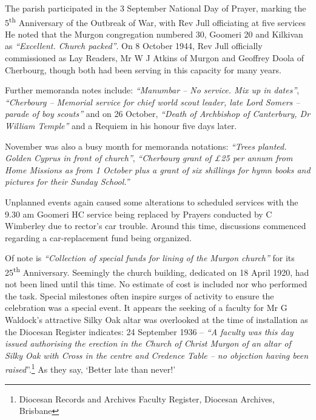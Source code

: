 The parish participated in the 3 September National Day of Prayer, marking the 5\textsuperscript{th} Anniversary of the Outbreak of War, with Rev Jull officiating at five services He noted that the Murgon congregation numbered 30, Goomeri 20 and Kilkivan as \emph{``Excellent. Church packed''}. On 8 October 1944, Rev Jull officially commissioned as Lay Readers, Mr W J Atkins of Murgon and Geoffrey Doola of Cherbourg, though both had been serving in this capacity for many years.



Further memoranda notes include: \emph{``Manumbar -- No service. Mix up in dates''}, \emph{``Cherbourg -- Memorial service for chief world scout leader, late Lord Somers -- parade of boy scouts''} and on 26 October, \emph{``Death of Archbishop of Canterbury, Dr William Temple''} and a Requiem in his honour five days later.



November was also a busy month for memoranda notations: \emph{``Trees planted. Golden Cyprus in front of church''}, \emph{``Cherbourg grant of \pounds25 per annum from Home Missions as from 1 October plus a grant of six shillings for hymn books and pictures for their Sunday School.''}



Unplanned events again caused some alterations to scheduled services with the 9.30 am Goomeri HC service being replaced by Prayers conducted by C Wimberley due to rector's car trouble. Around this time, discussions commenced regarding a car-replacement fund being organized.



Of note is \emph{``Collection of special funds for lining of the Murgon church''} for its 25\textsuperscript{th} Anniversary. Seemingly the church building, dedicated on 18 April 1920, had not been lined until this time. No estimate of cost is included nor who performed the task. Special milestones often inspire surges of activity to ensure the celebration was a special event. It appears the seeking of a faculty for Mr G Waldock's attractive Silky Oak altar was overlooked at the time of installation as the Diocesan Register indicates: 24 September 1936 -- \emph{``A faculty was this day issued authorising the erection in the Church of Christ Murgon of an altar of Silky Oak with Cross in the centre and Credence Table -- no objection having been raised}''.\footnote{Diocesan Records and Archives Faculty Register, Diocesan Archives, Brisbane} As they say, `Better late than never!'


